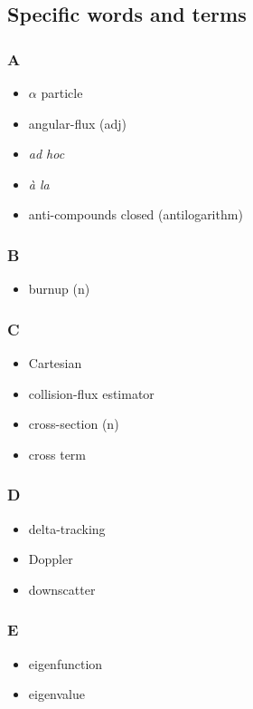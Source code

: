 \documentclass[10pt, letter]{article}
\begin{document}
\begin{multicols}{2}
\pagebreak

\section{Specific words and terms}\label{sec:words}

\subsubsection*{A}
\begin{itemize}
\item $\alpha$ particle
\item angular-flux (adj)
\item \textit{ad hoc}
\item \textit{\`{a} la}
\item anti-compounds closed (antilogarithm)
\end{itemize}

\subsubsection*{B}
\begin{itemize}
\item burnup (n)
\end{itemize}


\subsubsection*{C}
\begin{itemize}
\item Cartesian
\item collision-flux estimator
\item cross-section (n)
\item cross term
\end{itemize}

\subsubsection*{D}
\begin{itemize}
\item delta-tracking
\item Doppler
\item downscatter
\end{itemize}


\subsubsection*{E}
\begin{itemize}
\item eigenfunction
\item eigenvalue
\end{itemize}

\end{multicols}
\end{document}
